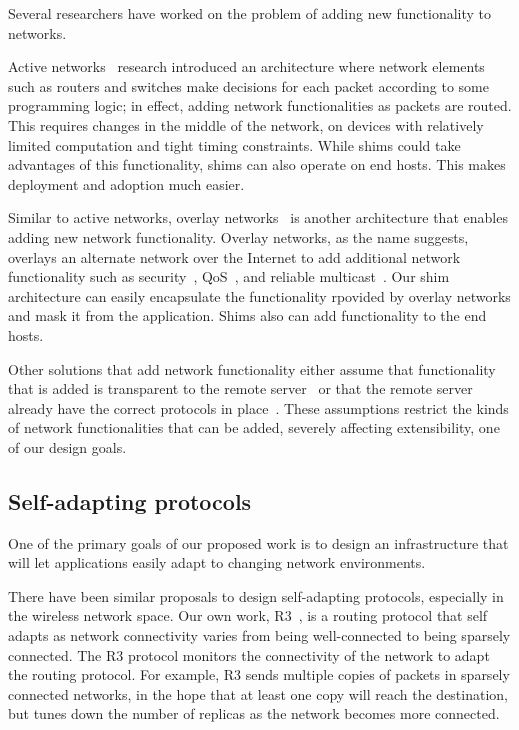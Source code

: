 Several researchers have worked on the problem of adding new 
functionality to networks. 

Active networks~\cite{tennenhouse1997survey} research introduced an 
architecture where network elements such as routers and switches make 
decisions for each packet according to some programming logic; in effect, 
adding network functionalities as packets are routed.  This requires changes
in the middle of the network, on devices with relatively limited computation
and tight timing constraints.  While shims could take advantages of this
functionality, shims can also operate on end hosts.   This makes 
deployment and adoption much easier. 

Similar to active networks, overlay networks~\cite{stoica2002internet} 
is another architecture that enables adding new network functionality.  
Overlay networks, as the name suggests, overlays an alternate network 
over the Internet to add additional network functionality such as 
security~\cite{ron}, QoS~\cite{overqos}, and reliable 
multicast~\cite{overcast}. Our shim architecture can easily encapsulate the
functionality rpovided by overlay networks and mask it from the application.
Shims also can add functionality to the end hosts.

Other solutions that add network functionality either assume that 
functionality that is added is transparent to the remote 
server~\cite{park2006connection,pucha2007exploiting, pucha2008adaptive, 
tolia2006architecture} or that the remote server already have the correct 
protocols in place~\cite{salz2002tesla, salz2003tesla, hutchinson1991x,
hutchinson23rpc,peterson1990x}. These assumptions restrict the kinds of 
network functionalities that can be added, severely affecting 
extensibility, one of our design goals.   

\subsection{Self-adapting protocols}

One of the primary goals of our proposed work is to design an 
infrastructure that will let applications easily adapt to changing 
network environments. 

There have been similar proposals to design self-adapting protocols, 
especially in the wireless network space. Our own work, R3~\cite{r3}, 
is a routing protocol that self adapts as network connectivity varies 
from being well-connected to being sparsely connected. The R3 protocol 
monitors the connectivity of the network to adapt the routing protocol. 
For example, R3 sends multiple copies of packets in sparsely connected 
networks, in the hope that at least one copy will reach the destination, 
but tunes down the number of replicas as the network becomes more connected.

